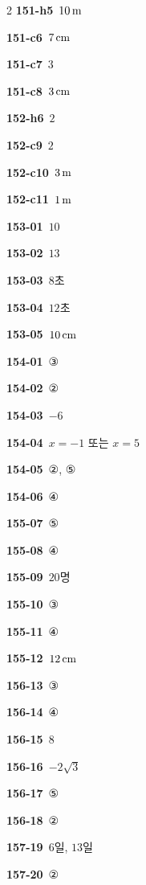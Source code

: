 \documentclass[10pt,a4paper]{article}
\begin{document}
\begin{multicols}{2}
\noindent\textbf{151-h5}\ $10\mkern3mu \mathrm{m}$\par
\noindent\textbf{151-c6}\ $7\mkern3mu \mathrm{cm}$\par
\noindent\textbf{151-c7}\ $3$\par
\noindent\textbf{151-c8}\ $3\mkern3mu \mathrm{cm}$\par
\noindent\textbf{152-h6}\ $2$\par
\noindent\textbf{152-c9}\ $2$\par
\noindent\textbf{152-c10}\ $3\mkern3mu \mathrm{m}$\par
\noindent\textbf{152-c11}\ $1\mkern3mu \mathrm{m}$\par
\noindent\textbf{153-01}\ $10$\par
\noindent\textbf{153-02}\ $13$\par
\noindent\textbf{153-03}\ $8$초\par
\noindent\textbf{153-04}\ $12$초\par
\noindent\textbf{153-05}\ $10\mkern3mu \mathrm{cm}$\par
\noindent\textbf{154-01}\ ③\par
\noindent\textbf{154-02}\ ②\par
\noindent\textbf{154-03}\ $-6$\par
\noindent\textbf{154-04}\ $x=-1$ 또는 $x=5$\par
\noindent\textbf{154-05}\ ②, ⑤\par
\noindent\textbf{154-06}\ ④\par
\noindent\textbf{155-07}\ ⑤\par
\noindent\textbf{155-08}\ ④\par
\noindent\textbf{155-09}\ $20$명\par
\noindent\textbf{155-10}\ ③\par
\noindent\textbf{155-11}\ ④\par
\noindent\textbf{155-12}\ $12\mkern3mu \mathrm{cm}$\par
\noindent\textbf{156-13}\ ③\par
\noindent\textbf{156-14}\ ④\par
\noindent\textbf{156-15}\ $8$\par
\noindent\textbf{156-16}\ $-2\sqrt{3}$\par
\noindent\textbf{156-17}\ ⑤\par
\noindent\textbf{156-18}\ ②\par
\noindent\textbf{157-19}\ $6$일, $13$일\par
\noindent\textbf{157-20}\ ②\par

\end{multicols}
\end{document}
